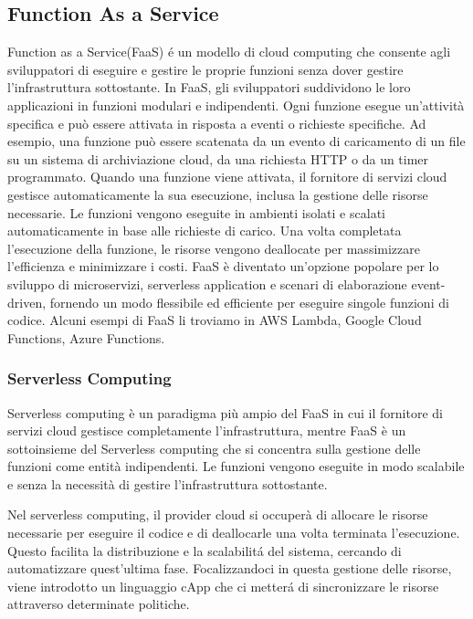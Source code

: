 \documentclass[../main.tex]{subfiles}
\begin{document}
\subsection{Function As a  Service}
Function as a Service(FaaS) é un modello di cloud computing che consente agli sviluppatori di eseguire e gestire le proprie funzioni senza dover gestire l'infrastruttura sottostante.
In FaaS, gli sviluppatori suddividono le loro applicazioni in funzioni modulari e indipendenti. Ogni funzione esegue un'attività specifica e può essere attivata in risposta a eventi o richieste specifiche. Ad esempio, una funzione può essere scatenata da un evento di caricamento di un file su un sistema di archiviazione cloud, da una richiesta HTTP o da un timer programmato. Quando una funzione viene attivata, il fornitore di servizi cloud gestisce automaticamente la sua esecuzione, inclusa la gestione delle risorse necessarie. Le funzioni vengono eseguite in ambienti isolati e scalati automaticamente in base alle richieste di carico. Una volta completata l'esecuzione della funzione, le risorse vengono deallocate per massimizzare l'efficienza e minimizzare i costi.
FaaS è diventato un'opzione popolare per lo sviluppo di microservizi, serverless application e scenari di elaborazione event-driven, fornendo un modo flessibile ed efficiente per eseguire singole funzioni di codice.
Alcuni esempi di FaaS li troviamo in AWS Lambda, Google Cloud Functions, Azure Functions.

\subsubsection{Serverless Computing}
Serverless computing è un paradigma più ampio del FaaS in cui il fornitore di servizi cloud gestisce completamente l'infrastruttura, mentre FaaS è un sottoinsieme del Serverless computing che si concentra sulla gestione delle funzioni come entità indipendenti. Le funzioni vengono eseguite in modo scalabile e senza la necessità di gestire l'infrastruttura sottostante.
\autocite{amslaurea24930}

Nel serverless computing, il provider cloud si occuperà di allocare le risorse necessarie per eseguire il codice e di deallocarle una volta terminata l'esecuzione. Questo facilita la distribuzione e la scalabilitá del sistema, cercando di automatizzare quest'ultima fase.
Focalizzandoci in questa gestione delle risorse, viene introdotto un linguaggio cApp che ci metterá di sincronizzare le risorse attraverso determinate politiche.
\end{document}

